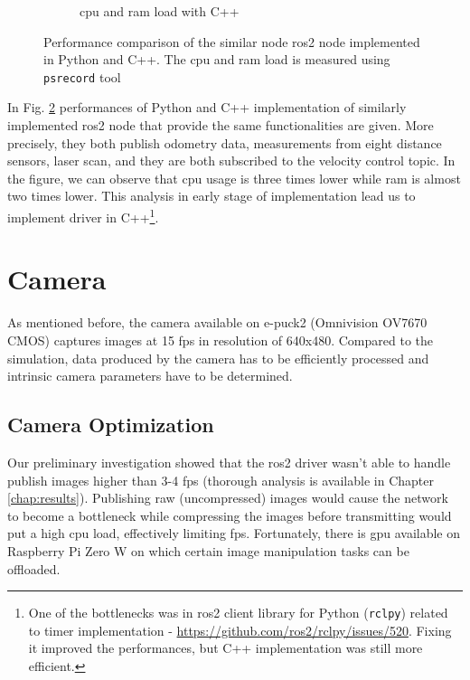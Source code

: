 \begin{figure}[H]
\begin{subfigure}{.8\textwidth}
  \caption{\ac{cpu} and \ac{ram} load with C++}
  \label{fig:physical:py_vs_cpp:cpp}
\end{subfigure}
\caption[Performance comparison of implementations in Python and C++]{Performance comparison of the similar node \ac{ros2} node implemented in Python and C++. The \ac{cpu} and \ac{ram} load is measured using \texttt{psrecord} tool}
\label{fig:physical:py_vs_cpp}
\end{figure}

In Fig. \ref{fig:physical:py_vs_cpp} performances of Python and C++ implementation of similarly implemented \ac{ros2} node that provide the same functionalities are given. More precisely, they both publish odometry data, measurements from eight distance sensors, laser scan, and they are both subscribed to the velocity control topic. In the figure, we can observe that \ac{cpu} usage is three times lower while \ac{ram} is almost two times lower. This analysis in early stage of implementation lead us to implement driver in C++\footnote{One of the bottlenecks was in \ac{ros2} client library for Python (\texttt{rclpy}) related to timer implementation - \url{https://github.com/ros2/rclpy/issues/520}. Fixing it improved the performances, but C++ implementation was still more efficient.}.


\section{Camera}
As mentioned before, the camera available on e-puck2 (Omnivision OV7670 CMOS) captures images at 15 \acs{fps} in resolution of 640x480. Compared to the simulation, data produced by the camera has to be efficiently processed and intrinsic camera parameters have to be determined.

\subsection{Camera Optimization}
Our preliminary investigation showed that the \ac{ros2} driver wasn't able to handle publish images higher than 3-4 \acs{fps} (thorough analysis is available in Chapter \ref{chap:results}). Publishing raw (uncompressed) images would cause the network to become a bottleneck while compressing the images before transmitting would put a high \ac{cpu} load, effectively limiting \ac{fps}. Fortunately, there is \ac{gpu} available on Raspberry Pi Zero W on which certain image manipulation tasks can be offloaded.

